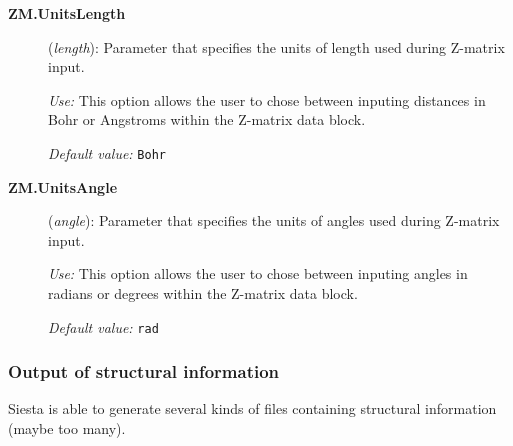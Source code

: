 \documentclass[11pt]{article}
\begin{document}
\begin{description}
\item[{\bf ZM.UnitsLength}] ({\it length}):
Parameter that specifies the units of length used during Z-matrix input.

{\it Use:} This option allows the user to chose between inputing distances
in Bohr or Angstroms within the Z-matrix data block.

{\it Default value:} {\tt Bohr}

\item[{\bf ZM.UnitsAngle}] ({\it angle}):
Parameter that specifies the units of angles used during Z-matrix input.

{\it Use:} This option allows the user to chose between inputing angles
in radians or degrees within the Z-matrix data block.

{\it Default value:} {\tt rad}

\end{description}



\subsubsection{Output of structural information}

{\sc Siesta} is able to generate several kinds of files containing
structural information (maybe too many).
\end{document}

